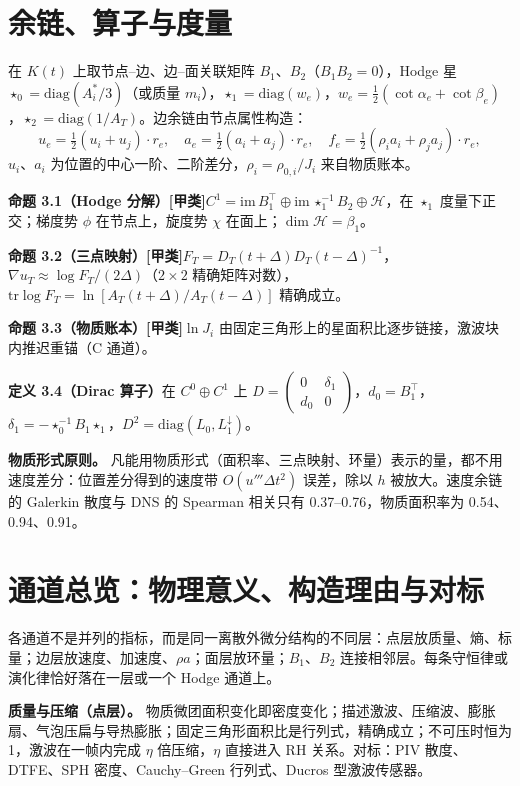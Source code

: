 \documentclass[11pt,a4paper]{article}
\newcommand{\prop}[2]{\par\smallskip\noindent\textbf{#1}\quad #2\par\smallskip}
\newcommand{\jia}{[甲类]}\newcommand{\yi}{[乙类]}\newcommand{\bing}{[丙类]}
\begin{document}
\section{余链、算子与度量}
在 $K(t)$ 上取节点–边、边–面关联矩阵 $B_1$、$B_2$（$B_1B_2=0$），Hodge 星 $\star_0=\mathrm{diag}(A^*_i/3)$（或质量 $m_i$），$\star_1=\mathrm{diag}(w_e)$，$w_e=\tfrac12(\cot\alpha_e+\cot\beta_e)$，$\star_2=\mathrm{diag}(1/A_T)$。边余链由节点属性构造：
\begin{equation}
u_e=\tfrac12(u_i+u_j)\cdot r_e,\quad a_e=\tfrac12(a_i+a_j)\cdot r_e,\quad f_e=\tfrac12(\rho_ia_i+\rho_ja_j)\cdot r_e,
\end{equation}
$u_i$、$a_i$ 为位置的中心一阶、二阶差分，$\rho_i=\rho_{0,i}/J_i$ 来自物质账本。
\prop{命题 3.1（Hodge 分解）\jia}{$C^1=\mathrm{im}\,B_1^{\top}\oplus\mathrm{im}\,\star_1^{-1}B_2\oplus\mathcal H$，在 $\star_1$ 度量下正交；梯度势 $\phi$ 在节点上，旋度势 $\chi$ 在面上；$\dim\mathcal H=\beta_1$。}
\prop{命题 3.2（三点映射）\jia}{$F_T=D_T(t+\Delta)D_T(t-\Delta)^{-1}$，$\nabla u_T\approx\log F_T/(2\Delta)$（$2\times2$ 精确矩阵对数），$\mathrm{tr}\log F_T=\ln[A_T(t+\Delta)/A_T(t-\Delta)]$ 精确成立。}
\prop{命题 3.3（物质账本）\jia}{$\ln J_i$ 由固定三角形上的星面积比逐步链接，激波块内推迟重锚（C 通道）。}
\prop{定义 3.4（Dirac 算子）}{在 $C^0\oplus C^1$ 上 $D=\begin{pmatrix}0&\delta_1\\ d_0&0\end{pmatrix}$，$d_0=B_1^{\top}$，$\delta_1=-\star_0^{-1}B_1\star_1$，$D^2=\mathrm{diag}(L_0,L_1^{\downarrow})$。}
\noindent\textbf{物质形式原则。} 凡能用物质形式（面积率、三点映射、环量）表示的量，都不用速度差分：位置差分得到的速度带 $O(u'''\Delta t^2)$ 误差，除以 $h$ 被放大。速度余链的 Galerkin 散度与 DNS 的 Spearman 相关只有 0.37–0.76，物质面积率为 0.54、0.94、0.91。

\section{通道总览：物理意义、构造理由与对标}\label{sec:overview}
各通道不是并列的指标，而是同一离散外微分结构的不同层：点层放质量、熵、标量；边层放速度、加速度、$\rho a$；面层放环量；$B_1$、$B_2$ 连接相邻层。每条守恒律或演化律恰好落在一层或一个 Hodge 通道上。

\textbf{质量与压缩（点层）。} 物质微团面积变化即密度变化；描述激波、压缩波、膨胀扇、气泡压扁与导热膨胀；固定三角形面积比是行列式，精确成立；不可压时恒为 1，激波在一帧内完成 $\eta$ 倍压缩，$\eta$ 直接进入 RH 关系。对标：PIV 散度、DTFE、SPH 密度、Cauchy–Green 行列式、Ducros 型激波传感器。
\end{document}
